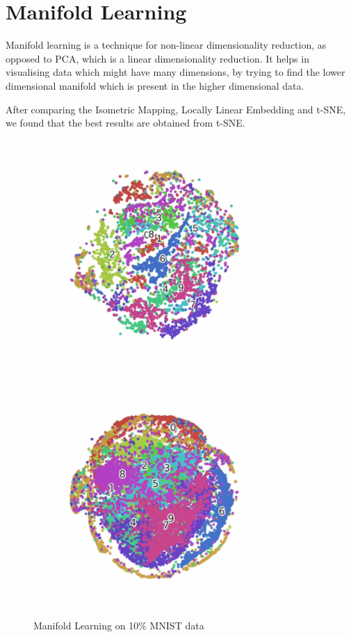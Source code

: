 \documentclass{article}
\begin{document}
\section{Manifold Learning}

Manifold learning\cite{gu2006improved} is a technique for non-linear dimensionality reduction, as opposed to PCA, which is a linear dimensionality reduction. It helps in visualising data which might have many dimensions, by trying to find the lower dimensional manifold which is present in the higher dimensional data.

After comparing the Isometric Mapping, Locally Linear Embedding and t-SNE, we found that the best results are obtained from t-SNE.
\begin{figure}
    \centering
    \begin{minipage}{0.45\textwidth}
        \centering
        \includegraphics[width=0.8\textwidth]{MNIST_10.png} %
        \caption{Manifold Learning on 10\% MNIST data}
    \end{minipage}\hfill
    \begin{minipage}{0.45\textwidth}
        \centering
        \includegraphics[width=0.8\textwidth]{MNIST_30.png} %

\end{minipage}
\end{figure}
\end{document}
